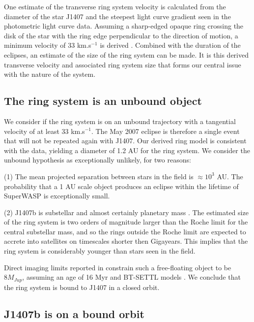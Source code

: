 \documentclass{emulateapj}
\begin{document}
One estimate of the transverse ring system velocity is calculated from
the diameter of the star J1407 and the steepest light curve gradient
seen in the photometric light curve data.
Assuming a sharp-edged opaque ring crossing the disk of the star with
the ring edge perpendicular to the direction of motion, a minimum
velocity of 33 km.s$^{-1}$ is derived \citep{Kenworthy15}.
Combined with the duration of the eclipses, an estimate of the size of
the ring system can be made.
It is this derived transverse velocity and associated ring system size
that forms our central issue with the nature of the system.

\subsection{The ring system is an unbound object}

We consider if the ring system is on an unbound trajectory with a tangential velocity of
at least 33 km.s$^{-1}$.
The May 2007 eclipse is therefore a single event that will not be repeated
again with J1407.
Our derived ring model is consistent with the data, yielding a diameter
of 1.2 AU for the ring system.
We consider the unbound hypothesis as exceptionally unlikely, for
two reasons:

(1) The mean projected separation between stars in the field is $\approx
10^3$ AU. The probability that a 1 AU scale object produces an eclipse within
the lifetime of SuperWASP is exceptionally small.

(2) J1407b is substellar and almost certainly planetary mass
\citep{Kenworthy15}.
The estimated size of the ring system is two orders of magnitude larger
than the Roche limit for the central substellar mass, and so the rings
outside the Roche limit are expected to accrete into satellites on
timescales shorter then Gigayears.
This implies that the ring system is considerably younger than stars
seen in the field.

Direct imaging limits reported in \citet{Kenworthy15} constrain such a
free-floating object to be $8 M_{Jup}$, assuming an age of 16 Myr and
BT-SETTL models \citep{Allard12}.
We conclude that the ring system is bound to J1407 in a closed orbit.

\subsection{J1407b is on a bound orbit}
\end{document}
